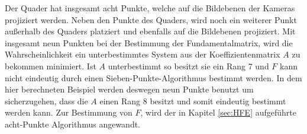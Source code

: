 Der Quader hat insgesamt acht Punkte, welche auf die Bildebenen der Kameras projiziert werden. Neben den Punkte des Quaders, wird noch ein weiterer Punkt außerhalb des Quaders platziert und ebenfalls auf die Bildebenen projiziert. Mit insgesamt neun Punkten bei der Bestimmung der Fundamentalmatrix, wird die Wahrscheinlichkeit ein unterbestimmtes System aus der Koeffizientenmatrix $A$ zu bekommen minimiert. Ist $A$ unterbestimmt so besitzt sie ein Rang 7 und $F$ kann nicht eindeutig durch einen Sieben-Punkte-Algorithmus bestimmt werden\cite{HZ,LongQuan}. In dem hier berechneten Beispiel werden deswegen neun Punkte benutzt um sicherzugehen, dass die $A$ einen Rang 8 besitzt und somit eindeutig bestimmt werden kann. Zur Bestimmung von $F$, wird der in Kapitel \ref{sec:HFE} aufgeführte acht-Punkte Algorithmus angewandt.\\





